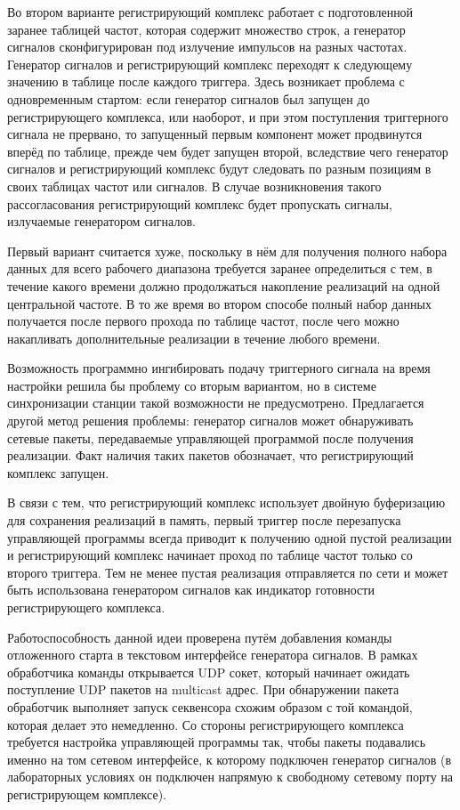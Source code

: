 \documentclass{report}
\begin{document}
Во втором варианте регистрирующий комплекс работает с подготовленной заранее таблицей частот, которая содержит множество строк, а генератор сигналов сконфигурирован под излучение импульсов на разных частотах. Генератор сигналов и регистрирующий комплекс переходят к следующему значению в таблице после каждого триггера. Здесь возникает проблема с одновременным стартом: если генератор сигналов был запущен до регистрирующего комплекса, или наоборот, и при этом поступления триггерного сигнала не прервано, то запущенный первым компонент может продвинутся вперёд по таблице, прежде чем будет запущен второй, вследствие чего генератор сигналов и регистрирующий комплекс будут следовать по разным позициям в своих таблицах частот или сигналов. В случае возникновения такого рассогласования регистрирующий комплекс будет пропускать сигналы, излучаемые генератором сигналов.

Первый вариант считается хуже, поскольку в нём для получения полного набора данных для всего рабочего диапазона требуется заранее определиться с тем, в течение какого времени должно продолжаться накопление реализаций на одной центральной частоте. В то же время во втором способе полный набор данных получается после первого прохода по таблице частот, после чего можно накапливать дополнительные реализации в течение любого времени.

Возможность программно ингибировать подачу триггерного сигнала на время настройки решила бы проблему со вторым вариантом, но в системе синхронизации станции такой возможности не предусмотрено. Предлагается другой метод решения проблемы: генератор сигналов может обнаруживать сетевые пакеты, передаваемые управляющей программой после получения реализации. Факт наличия таких пакетов обозначает, что регистрирующий комплекс запущен.

В связи с тем, что регистрирующий комплекс использует двойную буферизацию для сохранения реализаций  в память, первый триггер после перезапуска управляющей программы всегда приводит к получению одной пустой реализации и регистрирующий комплекс начинает проход по таблице частот только со второго триггера. Тем не менее пустая реализация отправляется по сети и может быть использована генератором сигналов как индикатор готовности регистрирующего комплекса.

Работоспособность данной идеи проверена путём добавления команды отложенного старта в текстовом интерфейсе генератора сигналов. В рамках обработчика команды открывается UDP сокет, который начинает ожидать поступление UDP пакетов на multicast адрес. При обнаружении пакета обработчик выполняет запуск секвенсора схожим образом с той командой, которая делает это немедленно. Со стороны регистрирующего комплекса требуется настройка управляющей программы так, чтобы пакеты подавались именно на том сетевом интерфейсе, к которому подключен генератор сигналов (в лабораторных условиях он подключен напрямую к свободному сетевому порту на регистрирующем комплексе).
\end{document}
